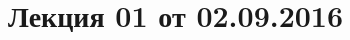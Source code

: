 \documentclass[a4paper, 12pt]{article}
\begin{document}
\pagestyle{fancy}
\section{Лекция 01 от 02.09.2016}
\end{document}

